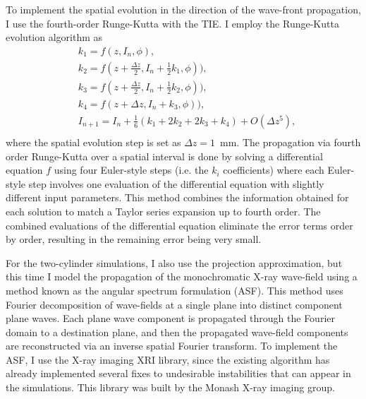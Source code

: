 \documentclass[9pt, a4paper]{article}
\begin{document}
To implement the spatial evolution in the direction of the wave-front propagation, I use the fourth-order Runge-Kutta with the TIE. I employ the Runge-Kutta evolution algorithm as
\begin{equation} \label{eq:4}
\begin{split}
&k_1 = f(z, I_n, \phi),\\
&k_2 = f(z + \frac{\Delta z}{2}, I_n + \frac{1}{2}k_1, \phi)),\\
&k_3 = f(z + \frac{\Delta z}{2}, I_n + \frac{1}{2}k_2, \phi)),\\
&k_4 = f(z + \Delta z, I_n + k_3, \phi)),\\
&I_{n + 1} = I_{n} + \frac{1}{6}(k_1 + 2k_2 + 2k_3 + k_4) + O(\Delta z^5),\\
\end{split}
\end{equation}
where the spatial evolution step is set as $\Delta z = 1$~mm. The propagation via fourth order Runge-Kutta over a spatial interval is done by solving a differential equation $f$ using four Euler-style steps (i.e. the $k_i$ coefficients) where each Euler-style step involves one evaluation of the differential equation with slightly different input parameters. This method combines the information obtained for each solution to match a Taylor series expansion up to fourth order. The combined evaluations of the differential equation eliminate the error terms order by order, resulting in the remaining error being very small\cite{N_R}.

For the two-cylinder simulations, I also use the projection approximation, but this time I model the propagation of the monochromatic X-ray wave-field using a method known as the angular spectrum formulation (ASF). This method uses Fourier decomposition of wave-fields at a single plane into distinct component plane waves. Each plane wave component is propagated through the Fourier domain to a destination plane, and then the propagated wave-field components are reconstructed via an inverse spatial Fourier transform\cite{Goodman}. To implement the ASF, I use the X-ray imaging XRI library, since the existing algorithm has already implemented several fixes to undesirable instabilities that can appear in the simulations. This library was built by the Monash X-ray imaging group.
\end{document}
